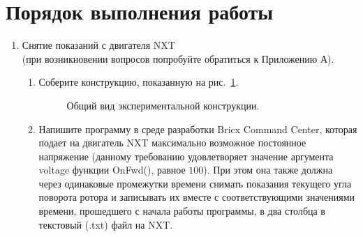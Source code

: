 \documentclass[12pt,a4paper,openany]{extarticle}
\begin{document}
\section{Порядок выполнения работы}
\begin{enumerate}
\item Снятие показаний с двигателя NXT\\(при возникновении вопросов попробуйте обратиться к Приложению А).
\begin{enumerate}
\item Соберите конструкцию, показанную на рис.~\ref{brick}.\\
\begin{figure}[h]
	\noindent{}
	\caption{Общий вид экспериментальной конструкции.}
	\label{brick}
\end{figure}
\item Напишите программу в среде разработки Bricx Command Center, которая подает на двигатель NXT максимально возможное постоянное напряжение (данному требованию удовлетворяет значение аргумента voltage функции OnFwd(), равное $100$).
При этом она также должна через одинаковые промежутки времени снимать показания текущего угла поворота ротора и записывать их вместе с соответствующими значениями времени, прошедшего с начала работы программы, в два столбца в текстовый (.txt) файл на NXT. 


\end{enumerate}
\end{enumerate}
\end{document}
